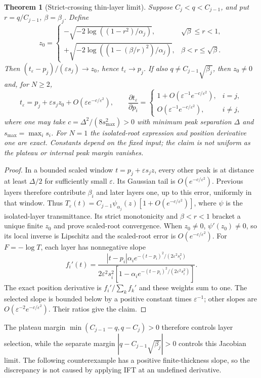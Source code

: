 \documentclass[11pt,a4paper]{article}
\newtheorem{theorem}{Theorem}
\begin{document}
\begin{theorem}[Strict-crossing thin-layer limit]
Suppose $C_j<q<C_{j-1}$, and put $r=q/C_{j-1}$, $\beta=\beta_j$.
Define
\[
 z_0=\begin{cases}
 -\sqrt{-2\log((1-r^2)/\alpha_j)},&\sqrt\beta\le r<1,\\
 +\sqrt{-2\log((1-(\beta/r)^2)/\alpha_j)},&\beta<r\le\sqrt\beta.
 \end{cases}
\]
Then $(t_\varepsilon-p_j)/(\varepsilon s_j)\to z_0$, hence
$t_\varepsilon\to p_j$.
If also $q\ne C_{j-1}\sqrt{\beta_j}$, then $z_0\ne0$ and, for $N\ge2$,
\[
 t_\varepsilon=p_j+\varepsilon s_jz_0+
 O(\varepsilon e^{-c/\varepsilon^2}),\qquad
 \frac{\partial t_\varepsilon}{\partial p_i}
 =\begin{cases}
 1+O(\varepsilon^{-1}e^{-c/\varepsilon^2}),&i=j,\\
 O(\varepsilon^{-1}e^{-c/\varepsilon^2}),&i\ne j,
 \end{cases}
\]
where one may take $c=\Delta^2/(8s_{\max}^2)>0$ with minimum peak
separation $\Delta$ and $s_{\max}=\max_i s_i$.
For $N=1$ the isolated-root expression and position derivative one are exact.
Constants depend on the fixed input; the claim is not uniform as the
plateau or internal peak margin vanishes.
\end{theorem}
\begin{proof}
In a bounded scaled window $t=p_j+\varepsilon s_jz$, every other peak
is at distance at least $\Delta/2$ for sufficiently small $\varepsilon$.
Its Gaussian tail is $O(e^{-c/\varepsilon^2})$.
Previous layers therefore contribute $\beta_i$ and later layers one,
up to this error, uniformly in that window. Thus
$T_\varepsilon(t)=C_{j-1}\psi_{\alpha_j}(z)
[1+O(e^{-c/\varepsilon^2})]$, where $\psi$ is the isolated-layer
transmittance. Its strict monotonicity and $\beta<r<1$ bracket a unique
finite $z_0$ and prove scaled-root convergence.
When $z_0\ne0$, $\psi'(z_0)\ne0$, so its local inverse is Lipschitz
and the scaled-root error is $O(e^{-c/\varepsilon^2})$.
For $F=-\log T$, each layer has nonnegative slope
\[
 f_i'(t)=\frac{|t-p_i|\alpha_i
 e^{-(t-p_i)^2/(2\varepsilon^2s_i^2)}}
 {2\varepsilon^2s_i^2[1-\alpha_i e^{-(t-p_i)^2/(2\varepsilon^2s_i^2)}]}.
\]
The exact position derivative is $f_i'/\sum_k f_k'$ and these
weights sum to one. The selected slope is bounded below by a
positive constant times $\varepsilon^{-1}$; other slopes are
$O(\varepsilon^{-2}e^{-c/\varepsilon^2})$. Their ratios give the claim.
\end{proof}

The plateau margin $\min(C_{j-1}-q,q-C_j)>0$ therefore controls layer
selection, while the separate margin
$|q-C_{j-1}\sqrt{\beta_j}|>0$ controls this Jacobian limit.
The following counterexample has a positive finite-thickness slope,
so the discrepancy is not caused by applying IFT at an undefined derivative.
\end{document}
